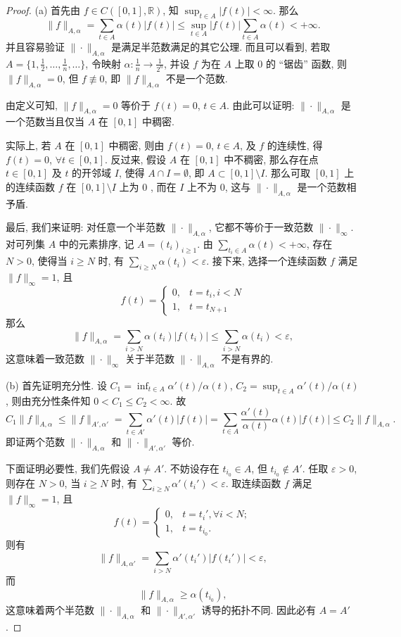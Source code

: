 \begin{proof}
    (a) 首先由 $f \in C([0,1], \mathbb{R})$, 知 $\sup_{t \in A}|f(t)|<\infty$. 那么
    \[\|f\|_{A,\alpha}=\sum_{t\in A}\alpha(t)|f(t)|\leq\sup_{t\in A}|f(t)|\sum_{t \in A} \alpha(t)<+\infty.\]
    并且容易验证 $\|\cdot\|_{A, \alpha}$ 是满足半范数满足的其它公理. 
    而且可以看到, 若取 $A=\{1,\frac{1}{2},\ldots,\frac{1}{n},\ldots\}$, 
    令映射 $\alpha: \frac{1}{n} \rightarrow \frac{1}{2^{n}}$, 
    并设 $f$ 为在 $A$ 上取 $0$ 的 “锯齿” 函数, 则 $\|f\|_{A,\alpha}=0$, 但 $f\not\equiv 0$, 即 $\|f\|_{A,\alpha}$ 不是一个范数.

    由定义可知, $\|f\|_{A, \alpha}=0$ 等价于 $f(t)=0$, $t\in A$. 由此可以证明: $\|\cdot\|_{A, \alpha}$ 
    是一个范数当且仅当 $A$ 在 $[0,1]$ 中稠密.

    实际上, 若 $A$ 在 $[0,1]$ 中稠密, 则由 $f(t)=0$, $t\in A$, 及 $f$ 的连续性, 得 $f(t)=0$, $\forall t \in[0,1]$. 
    反过来, 假设 $A$ 在 $[0,1]$ 中不稠密, 那么存在点 $t\in[0,1]$
    及 $t$ 的开邻域 $I$, 使得 $A\cap I=\emptyset$, 即 $A \subset[0,1]\setminus I$.
    那么可取 $[0,1]$ 上的连续函数 $f$ 在 $[0,1]\setminus I$ 上为 $0$ , 而在 $I$ 上不为 $0$, 
    这与 $\|\cdot\|_{A,\alpha}$ 是一个范数相予盾.

    最后, 我们来证明: 对任意一个半范数 $\|\cdot\|_{A,\alpha}$, 它都不等价于一致范数 $\|\cdot\|_{\infty}$.
    对可列集 $A$ 中的元素排序, 记 $A=(t_{i})_{i\geq 1}$. 
    由 $\sum_{t_i\in A} \alpha(t)<+\infty$, 存在 $N>0$, 使得当 $i\geq N$ 时, 
    有 $\sum_{i \geq N} \alpha(t_i)<\varepsilon$. 接下来, 选择一个连续函数 $f$ 满足 $\|f\|_{\infty}=1$, 且
    \[
    f(t)= \begin{cases}0, & t=t_{i}, i<N \\ 1, & t=t_{N+1}\end{cases}
    \]
    那么
    \[
    \|f\|_{A,\alpha}=\sum_{i>N} \alpha(t_i)|f(t_i)|\leq\sum_{i>N} \alpha(t_i)<\varepsilon,
    \]
    这意味着一致范数 $\|\cdot\|_{\infty}$ 关于半范数 $\|\cdot\|_{A,\alpha}$ 不是有界的.

    (b) 首先证明充分性. 设 $C_1=\inf_{t\in A}\alpha'(t)/\alpha(t)$, 
    $C_{2}=\sup_{t \in A} \alpha'(t)/\alpha(t)$, 则由充分性条件知 $0<C_1\leq C_2<\infty$. 故
    \[C_{1}\|f\|_{A,\alpha}\leq\|f\|_{A',\alpha'}=\sum_{t\in A'} \alpha'(t)|f(t)|=\sum_{t\in A} \frac{\alpha'(t)}{\alpha(t)} \alpha(t)|f(t)|\leq C_{2}\|f\|_{A,\alpha}.\]
    即证两个范数 $\|\cdot\|_{A, \alpha}$ 和 $\|\cdot\|_{A', \alpha'}$ 等价.

    下面证明必要性, 我们先假设 $A\neq A'$. 
    不妨设存在 $t_{i_0}\in A$, 但 $t_{i_{0}}\notin A'$. 任取 $\varepsilon>0$, 则存在 $N>0$, 
    当 $i\geq N$ 时, 有 $\sum_{i\geq N} \alpha'(t_i')<\varepsilon$. 取连续函数 $f$ 满足 $\|f\|_{\infty}=1$, 且
    \[f(t)=\begin{cases} 0, & t=t_{i}',\forall i<N; \\ 1, & t=t_{i_{0}} .\end{cases}\]
    则有
    \[\|f\|_{A,\alpha'}=\sum_{i>N} \alpha'(t_{i}')|f(t_{i}')|<\varepsilon,\]
    而
    \[\|f\|_{A, \alpha}\geq\alpha(t_{i_0}),\]
    这意味着两个半范数 $\|\cdot\|_{A, \alpha}$ 和 $\|\cdot\|_{A', \alpha'}$ 诱导的拓扑不同. 因此必有 $A=A'$.


\end{proof}
